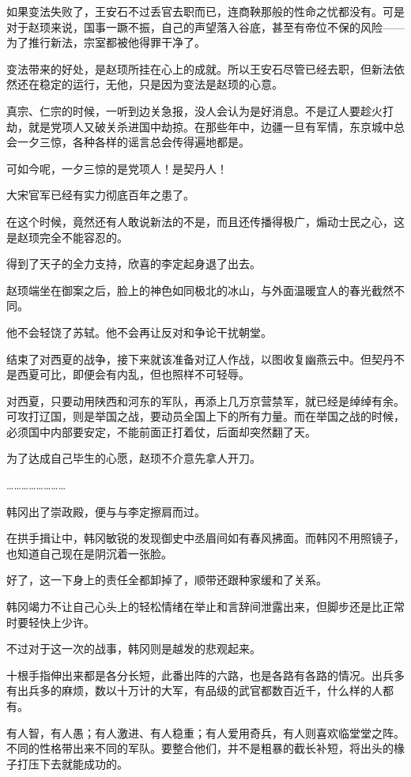 如果变法失败了，王安石不过丢官去职而已，连商鞅那般的性命之忧都没有。可是对于赵顼来说，国事一蹶不振，自己的声望落入谷底，甚至有帝位不保的风险——为了推行新法，宗室都被他得罪干净了。

变法带来的好处，是赵顼所挂在心上的成就。所以王安石尽管已经去职，但新法依然还在稳定的运行，无他，只是因为变法是赵顼的心意。

真宗、仁宗的时候，一听到边关急报，没人会认为是好消息。不是辽人要趁火打劫，就是党项人又破关杀进国中劫掠。在那些年中，边疆一旦有军情，东京城中总会一夕三惊，各种各样的谣言总会传得遍地都是。

可如今呢，一夕三惊的是党项人！是契丹人！

大宋官军已经有实力彻底百年之患了。

在这个时候，竟然还有人敢说新法的不是，而且还传播得极广，煽动士民之心，这是赵顼完全不能容忍的。

得到了天子的全力支持，欣喜的李定起身退了出去。

赵顼端坐在御案之后，脸上的神色如同极北的冰山，与外面温暖宜人的春光截然不同。

他不会轻饶了苏轼。他不会再让反对和争论干扰朝堂。

结束了对西夏的战争，接下来就该准备对辽人作战，以图收复幽燕云中。但契丹不是西夏可比，即便会有内乱，但也照样不可轻辱。

对西夏，只要动用陕西和河东的军队，再添上几万京营禁军，就已经是绰绰有余。可攻打辽国，则是举国之战，要动员全国上下的所有力量。而在举国之战的时候，必须国中内部要安定，不能前面正打着仗，后面却突然翻了天。

为了达成自己毕生的心愿，赵顼不介意先拿人开刀。

……………………

韩冈出了崇政殿，便与与李定擦肩而过。

在拱手揖让中，韩冈敏锐的发现御史中丞眉间如有春风拂面。而韩冈不用照镜子，也知道自己现在是阴沉着一张脸。

好了，这一下身上的责任全都卸掉了，顺带还跟种家缓和了关系。

韩冈竭力不让自己心头上的轻松情绪在举止和言辞间泄露出来，但脚步还是比正常时要轻快上少许。

不过对于这一次的战事，韩冈则是越发的悲观起来。

十根手指伸出来都是各分长短，此番出阵的六路，也是各路有各路的情况。出兵多有出兵多的麻烦，数以十万计的大军，有品级的武官都数百近千，什么样的人都有。

有人智，有人愚；有人激进、有人稳重；有人爱用奇兵，有人则喜欢临堂堂之阵。不同的性格带出来不同的军队。要整合他们，并不是粗暴的截长补短，将出头的椽子打压下去就能成功的。

